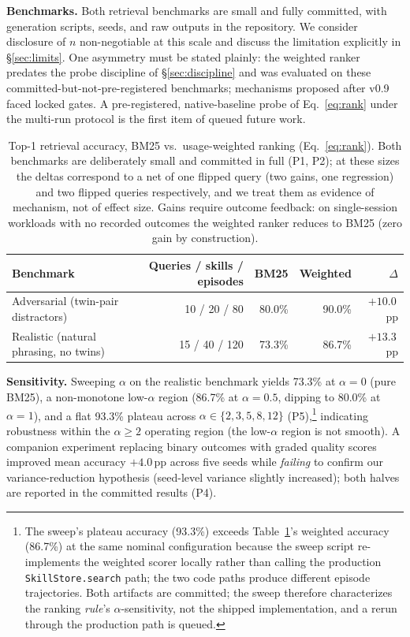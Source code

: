 \documentclass[11pt]{article}
\begin{document}
\textbf{Benchmarks.} Both retrieval benchmarks are small and fully committed, with generation scripts, seeds, and raw outputs in the repository. We consider disclosure of $n$ non-negotiable at this scale and discuss the limitation explicitly in \S\ref{sec:limits}. One asymmetry must be stated plainly: the weighted ranker predates the probe discipline of \S\ref{sec:discipline} and was evaluated on these committed-but-not-pre-registered benchmarks; mechanisms proposed after v0.9 faced locked gates. A pre-registered, native-baseline probe of Eq.~\ref{eq:rank} under the multi-run protocol is the first item of queued future work.

\begin{table}[t]
\centering
\small
\begin{tabular}{lrrrr}
\toprule
Benchmark & Queries / skills / episodes & BM25 & Weighted & $\Delta$ \\
\midrule
Adversarial (twin-pair distractors) & 10 / 20 / 80 & 80.0\% & 90.0\% & $+10.0$\,pp \\
Realistic (natural phrasing, no twins) & 15 / 40 / 120 & 73.3\% & 86.7\% & $+13.3$\,pp \\
\bottomrule
\end{tabular}
\caption{Top-1 retrieval accuracy, BM25 vs.\ usage-weighted ranking (Eq.~\ref{eq:rank}). Both benchmarks are deliberately small and committed in full (P1, P2); at these sizes the deltas correspond to a net of one flipped query (two gains, one regression) and two flipped queries respectively, and we treat them as evidence of mechanism, not of effect size. Gains require outcome feedback: on single-session workloads with no recorded outcomes the weighted ranker reduces to BM25 (zero gain by construction).}
\label{tab:retrieval}
\end{table}

\textbf{Sensitivity.} Sweeping $\alpha$ on the realistic benchmark yields 73.3\% at $\alpha{=}0$ (pure BM25), a non-monotone low-$\alpha$ region (86.7\% at $\alpha{=}0.5$, dipping to 80.0\% at $\alpha{=}1$), and a flat 93.3\% plateau across $\alpha \in \{2,3,5,8,12\}$ (P5),\footnote{The sweep's plateau accuracy (93.3\%) exceeds Table~\ref{tab:retrieval}'s weighted accuracy (86.7\%) at the same nominal configuration because the sweep script re-implements the weighted scorer locally rather than calling the production \texttt{SkillStore.search} path; the two code paths produce different episode trajectories. Both artifacts are committed; the sweep therefore characterizes the ranking \emph{rule}'s $\alpha$-sensitivity, not the shipped implementation, and a rerun through the production path is queued.} indicating robustness within the $\alpha \ge 2$ operating region (the low-$\alpha$ region is not smooth). A companion experiment replacing binary outcomes with graded quality scores improved mean accuracy $+4.0$\,pp across five seeds while \emph{failing} to confirm our variance-reduction hypothesis (seed-level variance slightly increased); both halves are reported in the committed results (P4).
\end{document}
